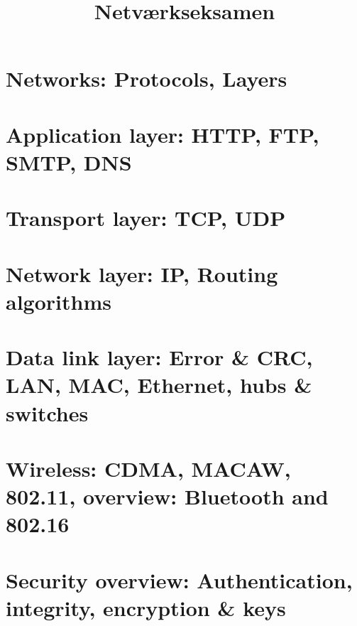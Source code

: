 \documentclass[12pt]{report}
\title{
	{Netværkseksamen}\\
}
\author{

}
\date{

}
\begin{document}
\maketitle

\tableofcontents

\chapter{Networks: Protocols, Layers}


\chapter{Application layer: HTTP, FTP, SMTP, DNS}


\chapter{Transport layer: TCP, UDP}


\chapter{Network layer: IP, Routing algorithms}


\chapter{Data link layer: Error \& CRC, LAN, MAC, Ethernet, hubs \& switches}


\chapter{Wireless: CDMA, MACAW, 802.11, overview: Bluetooth and 802.16}


\chapter{Security overview: Authentication, integrity, encryption \& keys}

\end{document}
